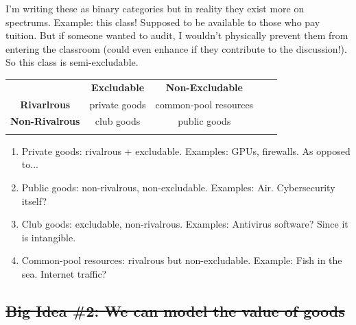 \documentclass[11pt]{article}
\begin{document}
I'm writing these as binary categories but in reality they exist more on spectrums.
Example: this class! Supposed to be available to those who pay tuition. But if someone wanted to audit, I wouldn't physically prevent them from entering the classroom (could even enhance if they contribute to the discussion!). So this class is semi-excludable.

\begin{table}[]
    \centering
    \begin{tabular}{lccll}
    \cline{1-3}
    \multicolumn{1}{|l|}{\cellcolor[HTML]{EFEFEF}}                       & \multicolumn{1}{c|}{\cellcolor[HTML]{EFEFEF}\textbf{Excludable}} & \multicolumn{1}{c|}{\cellcolor[HTML]{EFEFEF}\textbf{Non-Excludable}} &  &  \\ \cline{1-3}
    \multicolumn{1}{|c|}{\cellcolor[HTML]{EFEFEF}\textbf{Rivarlrous}}    & \multicolumn{1}{c|}{private goods}                               & \multicolumn{1}{c|}{common-pool resources}                           &  &  \\ \cline{1-3}
    \multicolumn{1}{|c|}{\cellcolor[HTML]{EFEFEF}\textbf{Non-Rivalrous}} & \multicolumn{1}{c|}{club goods}                                  & \multicolumn{1}{c|}{public goods}                                    &  &  \\ \cline{1-3}
                                                                            & \multicolumn{1}{l}{}                                             & \multicolumn{1}{l}{}                                                 &  & 
    \end{tabular}
\end{table}

\begin{enumerate}
    \item Private goods: rivalrous + excludable. Examples: GPUs, firewalls. As opposed to...
    \item Public goods: non-rivalrous, non-excludable. Examples: Air. Cybersecurity itself?
    \item Club goods: excludable, non-rivalrous. Examples: Antivirus software? Since it is intangible. 
    \item Common-pool resources: rivalrous but non-excludable. Example: Fish in the sea. Internet traffic?
\end{enumerate}

\subsection{\sout{Big Idea \#2: We can model the value of goods}}
\end{document}
